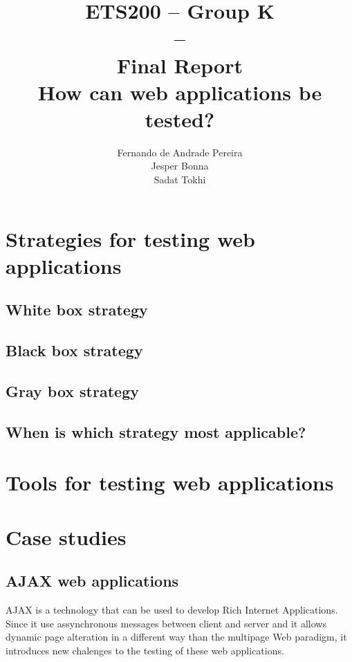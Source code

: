 \documentclass[a4paper]{article}
\title{ETS200 -- Group K\\--\\ Final Report \\
How can web applications be tested?
}
\author{Fernando de Andrade Pereira
\\Jesper Bonna
\\Sadat Tokhi
}
\begin{document}
\maketitle
\thispagestyle{empty}
\clearpage

\tableofcontents
\thispagestyle{empty}
\clearpage

\setcounter{page}{1}

\section{Strategies for testing web applications}

\subsection{White box strategy}

\subsection{Black box strategy}

\subsection{Gray box strategy}

\subsection{When is which strategy most applicable?}

\section{Tools for testing web applications}

\section{Case studies}

\subsection{AJAX web applications \cite{mtr08}}
AJAX is a technology that can be used to develop Rich Internet Applications.
Since it use assynchronous messages between client and server and it allows dynamic page alteration in a different way than the multipage Web paradigm, it introduces new chalenges to the testing of these web applications.
\end{document}
